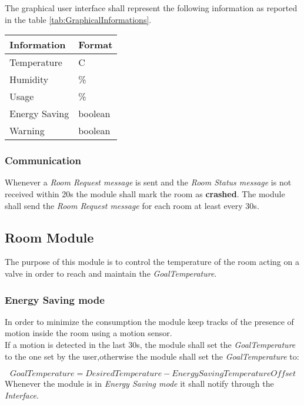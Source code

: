 The graphical user interface shall represent the following information as reported in the table \ref{tab:GraphicalInformations}.
\begin{table}[H]
	\centering
			\begin{tabular}{||l | l||} 
			\hline
			\textbf{Information}	& \textbf{Format} \\ 
			\hline
			Temperature	& C\degree \\ 
			\hline
			Humidity	& \% \\ 
			\hline
			Usage		& \% \\ 
			\hline
			Energy Saving	& boolean \\ 
			\hline
			Warning		& boolean \\ 
			\hline
		\end{tabular}
\end{table}

\subsubsection{Communication}
Whenever a \textit{Room Request message} is sent and the \textit{Room Status message} is not received within 20s the module shall mark the room as \textbf{crashed}.
The module shall send the \textit{Room Request message} for each room at least every 30s.

\subsection{Room Module}
The purpose of this module is to control the temperature of the room acting on a valve in order to 
reach and maintain the \textit{GoalTemperature}.

\subsubsection{Energy Saving mode}
In order to minimize the consumption the module keep tracks of the presence of motion inside the room
using a motion sensor. \\

If a motion is detected in the last 30s, the module shall set the \textit{GoalTemperature} to the one set by the user,otherwise the module shall set the \textit{GoalTemperature} to:

\begin{equation}
	GoalTemperature = DesiredTemperature - EnergySavingTemperatureOffset
\end{equation}
Whenever the module is in \textit{Energy Saving mode} it shall notify through the \textit{Interface}.

